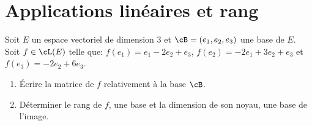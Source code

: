 \documentclass[a4paper, 11pt,reqno]{article}
\begin{document}
\vspace{1cm}
% 
\noindent\section{\large{Applications lin\'eaires et rang}}
\begin{exercice}  \;
	Soit $E$ un espace vectoriel de dimension 3 et $\cB=(e_1,e_2,e_3)$ une base de $E$. Soit $f\in\cL(E)$ telle que: $f(e_1)=e_1-2e_2+e_3$, $f(e_2)=-2e_1+3e_2+e_3$ et $f(e_3)=-2e_2+6e_3$.
	\begin{enumerate}
		\item \'Ecrire la matrice de $f$ relativement \`a la base $\cB$.
		\item D\'eterminer le rang de $f$, une base et la dimension de son noyau, une base de l'image.
	\end{enumerate}
\end{exercice}
\end{document}
